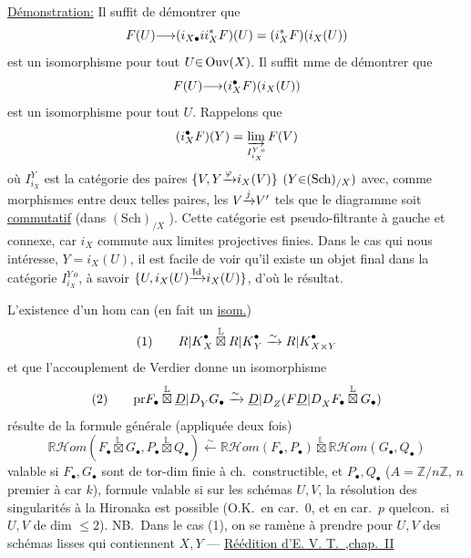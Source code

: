 \uline{Démonstration:} Il suffit de démontrer que
\[
F(U){\longrightarrow}(i_{X\bullet}ii_X^{{*}}F)(U)=(i_X^{{*}}F)(i_X(U))
\]
est un isomorphisme pour tout $U{\in}\operatorname{Ouv}(X)$. Il suffit mme de démontrer que
\[
F(U){\longrightarrow}(i_X^\bullet F)(i_X(U))
\]
est un isomorphisme pour tout $U$. Rappelons que
\[
(i_X^\bullet F)(Y)=\varinjlim_{I_{i_X}^{Y\,o}}F(V)
\]
où $I_{i_X}^{Y}$ est la catégorie des paires ${\{}V,Y{\xrightarrow{\varphi}}i_X(V){\}}$ $(Y{\in}(\mathrm{Sch})_{/X})$ avec, comme morphismes entre deux telles paires, les $V{\xrightarrow{j}}V'$ tels que le diagramme
soit \uline{commutatif} (dans $(\mathrm{Sch})_{/X}$ ). Cette catégorie est pseudo-filtrante à gauche et connexe, car $i_X$ commute aux limites projectives finies. Dans le cas qui nous intéresse, $Y=i_X(U)$, il est facile de voir qu'il existe  un objet final dans la catégorie $I_{i_X}^{Y\,o}$, à savoir ${\{}U,i_X(U){\xrightarrow{\mathrm{Id}}}i_X(U){\}}$, d'où le résultat.

L'existence d'un hom can (en fait un \uline{isom.})
\[
\text{(1)}\qquad {R|K}_X^\bullet\overset{\mathbb{L}}{\boxtimes}{R|K}_Y^\bullet\xrightarrow{\sim}{R|K}_{X\times Y}^\bullet
\]
et  que l'accouplement de Verdier donne un isomorphisme
\[
\text{(2)}\qquad{{\operatorname{pr}}}F_\bullet\overset{\mathbb{L}}{\boxtimes}{\underline{D}|D}_Y G_\bullet\xrightarrow{\sim}{\underline{D}|D}_Z({{F}}{\underline{D}|D}_X F_\bullet\overset{\mathbb{L}}{\boxtimes}G_\bullet)
\]
résulte de la formule générale (appliquée deux fois)
\[
\boxed{\mathbb{R}\mathcal{H}om(F_\bullet\overset{\mathbb{L}}{\boxtimes}G_\bullet,P_\bullet\overset{\mathbb{L}}{\boxtimes}Q_\bullet)\xleftarrow{\sim}\mathbb{R}\mathcal{H}om(F_\bullet,P_\bullet)\overset{\mathbb{L}}{\boxtimes}\mathbb{R}\mathcal{H}om(G_\bullet,Q_\bullet)}
\]
valable si $F_\bullet,G_\bullet$ sont de tor-dim finie à ch.\ constructible, et $P_\bullet,Q_\bullet$  
($A=\mathbb{Z}/n\mathbb{Z}$, $n$ premier à car $k$),
formule valable si sur les schémas  $U,V$,  la résolution des singularités à la Hironaka est possible (O.K.\ en car.\ 0, et en car.\ $p$ quelcon.\ si $U,V$ de dim $\leq2$).
NB.\ Dans le cas (1), on se ramène à prendre pour $U,V$ des schémas lisses qui contiennent $X,Y$ --- 
\uline{Réédition d'E. V. T.\ ,chap.\ II} 

